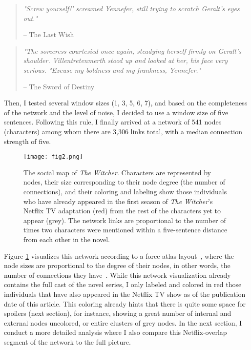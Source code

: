 \documentclass[fleqn,12pt]{wlscirep}
\begin{document}
\begin{quote}
{\it \small  "Screw yourself!' screamed Yennefer, still trying to scratch Geralt's eyes out."} 

-- { \small The Last Wish}
\end{quote}


\begin{quote}
{\it \small "The sorceress courtesied once again, steadying herself firmly on Geralt's shoulder. Villentretenmerth stood up and looked at her, his face very serious. "Excuse my boldness and my frankness, Yennefer."}

-- {\small The Sword of Destiny}
\end{quote}


Then, I tested several window sizes (1, 3, 5, 6, 7), and based on the completeness of the network and the level of noise, I decided to use a window size of five sentences. Following this rule, I finally arrived at a network of 541 nodes (characters) among whom there are 3,306 links total, with a median connection strength of five.



\begin{figure}[!hbt]
\centering
\texttt{[image: fig2.png]}
\caption{The social map of {\it The Witcher}. Characters are represented by nodes, their size corresponding to their node degree (the number of connections), and their coloring and labeling show those individuals who have already appeared in the first season of {\it The Witcher}’s Netflix TV adaptation (red) from the rest of the characters yet to appear (grey). The network links are proportional to the number of times two characters were mentioned within a five-sentence distance from each other in the novel.}
\label{fig:fig2}
\end{figure}


Figure \ref{fig:fig2} visualizes this network according to a force atlas layout~\cite{force}, where the node sizes are proportional to the degree of their nodes, in other words, the number of connections they have~\cite{netsci}. While this network visualization already contains the full cast of the novel series, I only labeled and colored in red those individuals that have also appeared in the Netflix TV show as of the publication date of this article. This coloring already hints that there is quite some space for spoilers (next section), for instance, showing a great number of internal and external nodes uncolored, or entire clusters of grey nodes. In the next section, I conduct a more detailed analysis where I also compare this Netflix-overlap segment of the network to the full picture.
\end{document}
